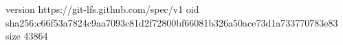 version https://git-lfs.github.com/spec/v1
oid sha256:c66f53a7824c9aa7093c81d2f72800bf66081b326a50ace73d1a733770783e83
size 43864
